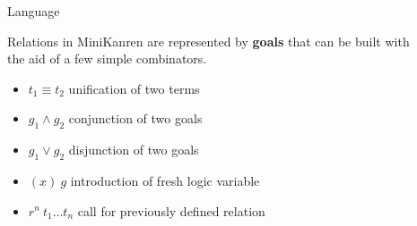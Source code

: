 \documentclass[final]{beamer}
\newlength{\sepwid}
\newlength{\onecolwid}
\begin{document}
\begin{frame}[fragile]
\begin{columns}[t]
\begin{column}{\onecolwid}
\begin{comment}
If we use it to get all splitings of given list, search will diverge.

But if we swap conjuncts (1) and (2) execution in any direction will terminate.

Reason: evaluation of conjunction is non-commutative.

In more complex cases, different directions of program execution may require different orders of conjuncts to terminate.

\begin{alertblock}{Goal}

Make it easier to write refutationally complete relations, i.e. programs that always terminate whenever there are finitely many answers.

\end{alertblock} 

\end{block}

\end{comment}

\end{column} %


\begin{column}{\sepwid}\end{column} %


\begin{column}{\onecolwid} %

\begin{block}{Language}

Relations in MiniKanren are represented by \textbf{goals} that can be built with the aid of a few simple combinators.

\begin{itemize}
  \item $t_1 \equiv t_2$ \quad unification of two terms
  \item $g_1 \wedge g_2$ \quad conjunction of two goals
  \item $g_1 \vee g_2$ \quad disjunction of two goals
  \item {} $(x) \ g$ \quad introduction of fresh logic variable
  \item $r^n \ t_1 \dots t_n$ \quad call for previously defined relation
\end{itemize}

\begin{comment}




\end{comment}
\end{block}
\end{column}
\end{columns}
\end{frame}
\end{document}
